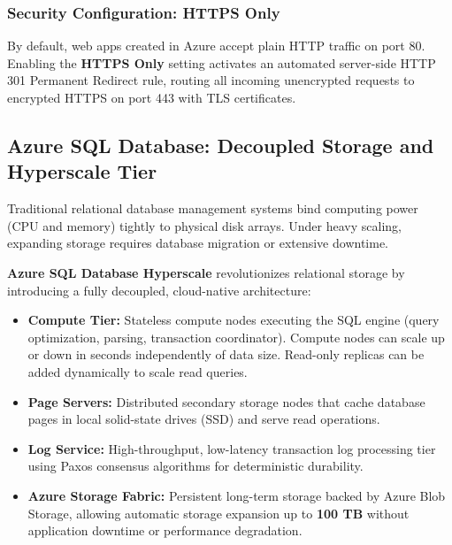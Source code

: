 \subsubsection{Security Configuration: HTTPS Only}
By default, web apps created in Azure accept plain HTTP traffic on port 80. Enabling the \textbf{HTTPS Only} setting activates an automated server-side HTTP 301 Permanent Redirect rule, routing all incoming unencrypted requests to encrypted HTTPS on port 443 with TLS certificates.

\subsection{Azure SQL Database: Decoupled Storage and Hyperscale Tier}
Traditional relational database management systems bind computing power (CPU and memory) tightly to physical disk arrays. Under heavy scaling, expanding storage requires database migration or extensive downtime.

\textbf{Azure SQL Database Hyperscale} revolutionizes relational storage by introducing a fully decoupled, cloud-native architecture:
\begin{itemize}[leftmargin=*]
  \item \textbf{Compute Tier:} Stateless compute nodes executing the SQL engine (query optimization, parsing, transaction coordinator). Compute nodes can scale up or down in seconds independently of data size. Read-only replicas can be added dynamically to scale read queries.
  \item \textbf{Page Servers:} Distributed secondary storage nodes that cache database pages in local solid-state drives (SSD) and serve read operations.
  \item \textbf{Log Service:} High-throughput, low-latency transaction log processing tier using Paxos consensus algorithms for deterministic durability.
  \item \textbf{Azure Storage Fabric:} Persistent long-term storage backed by Azure Blob Storage, allowing automatic storage expansion up to \textbf{100 TB} without application downtime or performance degradation.
\end{itemize}

